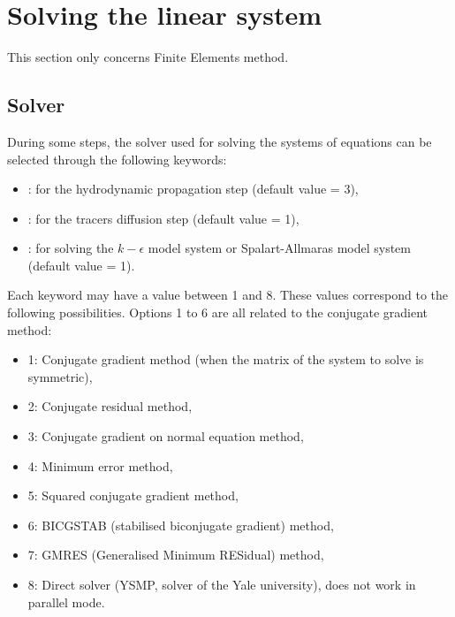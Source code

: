 \section{Solving the linear system}

This section only concerns Finite Elements method.
\subsection{Solver}

During some steps, the solver used for solving the systems of equations
can be selected through the following keywords:

\begin{itemize}
\item {}: for the hydrodynamic propagation step
(default value = 3),

\item {}: for the tracers diffusion step
(default value = 1),

\item {}:
for solving the $k-\epsilon$ model system or Spalart-Allmaras model system
(default value = 1).
\end{itemize}

Each keyword may have a value between 1 and 8.
These values correspond to the following possibilities.
Options 1 to 6 are all related to the conjugate gradient method:

\begin{itemize}
\item 1: Conjugate gradient method (when the matrix of the system to solve
is symmetric),

\item 2: Conjugate residual method,

\item 3: Conjugate gradient on normal equation method,

\item 4: Minimum error method,

\item 5: Squared conjugate gradient method,

\item 6: BICGSTAB (stabilised biconjugate gradient) method,

\item 7: GMRES (Generalised Minimum RESidual) method,

\item 8: Direct solver (YSMP, solver of the Yale university),
does not work in parallel mode.

\end{itemize}

